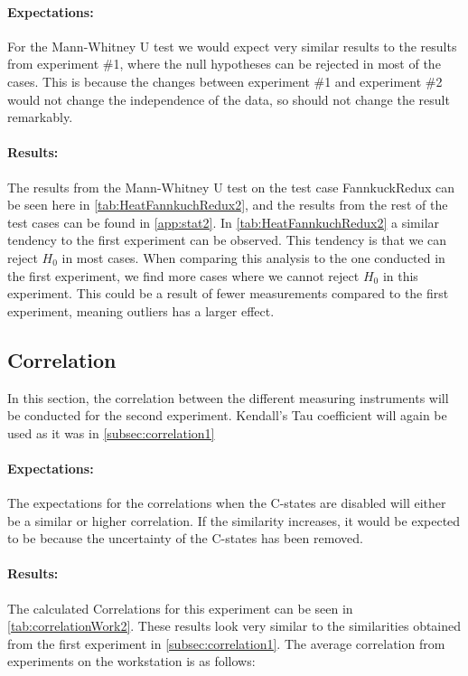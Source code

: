 \paragraph{Expectations:} For the Mann-Whitney U test we would expect very similar results to the results from experiment \#1, where the null hypotheses can be rejected in most of the cases. This is because the changes between experiment \#1 and experiment \#2 would not change the independence of the data, so should not change the result remarkably.



\paragraph{Results:} The results from the Mann-Whitney U test on the test case FannkuckRedux can be seen here in \cref{tab:HeatFannkuchRedux2}, and the results from the rest of the test cases can be found in \cref{app:stat2}. In \cref{tab:HeatFannkuchRedux2}  a similar tendency to the first experiment can be observed. This tendency is that we can reject $H_0$ in most cases. When comparing this analysis to the one conducted in the first experiment, we find more cases where we cannot reject $H_0$ in this experiment. This could be a result of fewer measurements compared to the first experiment, meaning outliers has a larger effect.

\subsection{Correlation}\label{subsec:correlation2}
In this section, the correlation between the different measuring instruments will be conducted for the second experiment. Kendall's Tau coefficient\cite{kendall1938new} will again be used as it was in \cref{subsec:correlation1}

\paragraph{Expectations:} The expectations for the correlations when the C-states are disabled will either be a similar or higher correlation. If the similarity increases, it would be expected to be because the uncertainty of the C-states has been removed.



\paragraph{Results:} The calculated Correlations for this experiment can be seen in \cref{tab:correlationWork2}. These results look very similar to the similarities obtained from the first experiment in \cref{subsec:correlation1}. The average correlation from experiments on the workstation is as follows:

